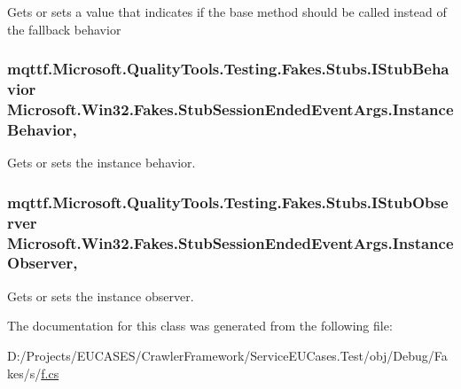 Gets or sets a value that indicates if the base method should be called instead of the fallback behavior

\hypertarget{class_microsoft_1_1_win32_1_1_fakes_1_1_stub_session_ended_event_args_ac964edfe3704f67db49fc87580b7b432}{
\subsubsection[{Instance\-Behavior}]{\setlength{\rightskip}{0pt plus 5cm}mqttf.\-Microsoft.\-Quality\-Tools.\-Testing.\-Fakes.\-Stubs.\-I\-Stub\-Behavior Microsoft.\-Win32.\-Fakes.\-Stub\-Session\-Ended\-Event\-Args.\-Instance\-Behavior\hspace{0.3cm}{\ttfamily [get]}, {\ttfamily [set]}}}\label{class_microsoft_1_1_win32_1_1_fakes_1_1_stub_session_ended_event_args_ac964edfe3704f67db49fc87580b7b432}


Gets or sets the instance behavior.

\hypertarget{class_microsoft_1_1_win32_1_1_fakes_1_1_stub_session_ended_event_args_a207d799f0de8dd997566c1cd63732656}{
\subsubsection[{Instance\-Observer}]{\setlength{\rightskip}{0pt plus 5cm}mqttf.\-Microsoft.\-Quality\-Tools.\-Testing.\-Fakes.\-Stubs.\-I\-Stub\-Observer Microsoft.\-Win32.\-Fakes.\-Stub\-Session\-Ended\-Event\-Args.\-Instance\-Observer\hspace{0.3cm}{\ttfamily [get]}, {\ttfamily [set]}}}\label{class_microsoft_1_1_win32_1_1_fakes_1_1_stub_session_ended_event_args_a207d799f0de8dd997566c1cd63732656}


Gets or sets the instance observer.



The documentation for this class was generated from the following file\-:\begin{DoxyCompactItemize}
\item 
D\-:/\-Projects/\-E\-U\-C\-A\-S\-E\-S/\-Crawler\-Framework/\-Service\-E\-U\-Cases.\-Test/obj/\-Debug/\-Fakes/s/\hyperlink{s_2f_8cs}{f.\-cs}\end{DoxyCompactItemize}
